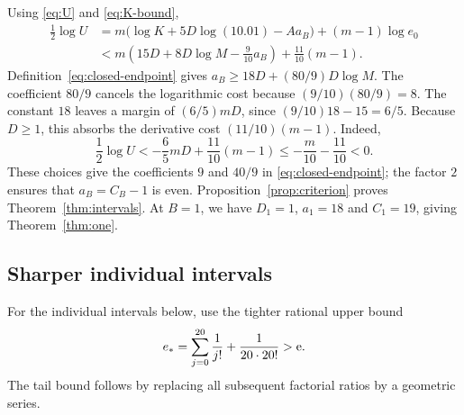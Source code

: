 Using \eqref{eq:U} and \eqref{eq:K-bound},
\begin{align*}
 \frac12\log U
 &=m\bigl(\log K+5D\log(10.01)-Aa_B\bigr)
                                      +(m-1)\log e_0\\
 &<m\left(15D+8D\log M-\frac9{10}a_B\right)
                                      +\frac{11}{10}(m-1).
\end{align*}
Definition~\eqref{eq:closed-endpoint} gives
$a_B\ge18D+(80/9)D\log M$.
The coefficient $80/9$ cancels the logarithmic cost because
$(9/10)(80/9)=8$. The constant $18$ leaves a margin of
$(6/5)mD$, since $(9/10)18-15=6/5$. Because $D\ge1$, this
absorbs the derivative cost $(11/10)(m-1)$. Indeed,
\[
 \frac12\log U
 <-\frac65mD+\frac{11}{10}(m-1)
 \le-\frac m{10}-\frac{11}{10}<0.
\]
These choices give the coefficients $9$ and $40/9$ in
\eqref{eq:closed-endpoint}; the factor $2$ ensures that
$a_B=C_B-1$ is even.
Proposition~\ref{prop:criterion} proves Theorem~\ref{thm:intervals}.
At $B=1$, we have $D_1=1$, $a_1=18$ and $C_1=19$, giving
Theorem~\ref{thm:one}.

\subsection{Sharper individual intervals}\label{sec:finite-endpoints}

For the individual intervals below, use the tighter rational upper bound
\begin{equation}\label{eq:e-tight}
 e_*=\sum_{j=0}^{20}\frac1{j!}+\frac1{20\cdot20!}>\mathrm e.
\end{equation}
The tail bound follows by replacing all subsequent factorial
ratios by a geometric series.

